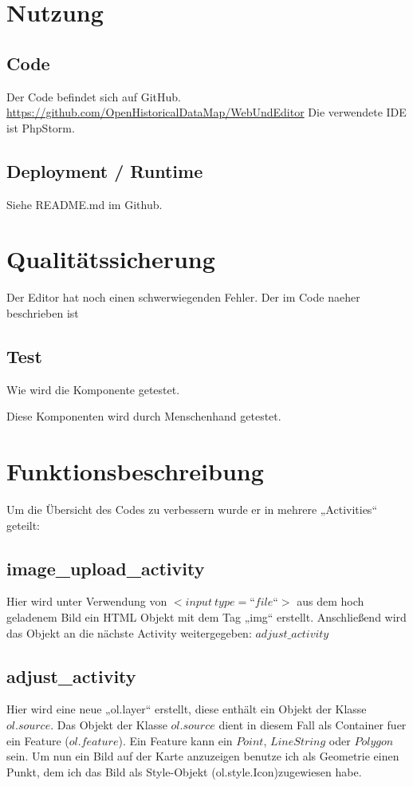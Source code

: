 \documentclass[a4paper, 12.5pt]{scrartcl}
\begin{document}
\section{Nutzung}
\subsection{Code}
Der Code befindet sich auf GitHub. \url{https://github.com/OpenHistoricalDataMap/WebUndEditor}
Die verwendete IDE ist PhpStorm.

\subsection{Deployment / Runtime}
Siehe README.md im Github.

\section{Qualitätssicherung}

Der Editor hat noch einen schwerwiegenden Fehler. Der im Code naeher beschrieben ist

\subsection{Test}
Wie wird die Komponente getestet.

Diese Komponenten wird durch Menschenhand getestet.

\section{Funktionsbeschreibung}

Um die Übersicht des Codes zu verbessern wurde er in mehrere „Activities“ geteilt:

\subsection{image\_upload\_activity}
Hier wird unter Verwendung von $<input\ type=“file“>$ aus dem hoch geladenem Bild ein HTML Objekt mit dem Tag „img“ erstellt.
Anschließend wird das Objekt an die nächste Activity weitergegeben: $adjust\_activity$

\subsection{adjust\_activity}
Hier wird eine neue „ol.layer“ erstellt, diese enthält ein Objekt der Klasse $ol.source$. Das Objekt der Klasse $ol.source$ dient in diesem Fall als Container fuer ein Feature ($ol.feature$).
Ein Feature kann ein $Point$, $LineString$ oder $Polygon$ sein.
Um nun ein Bild auf der Karte anzuzeigen benutze ich als Geometrie einen Punkt, dem ich das Bild als Style-Objekt (ol.style.Icon)zugewiesen habe.
\end{document}

